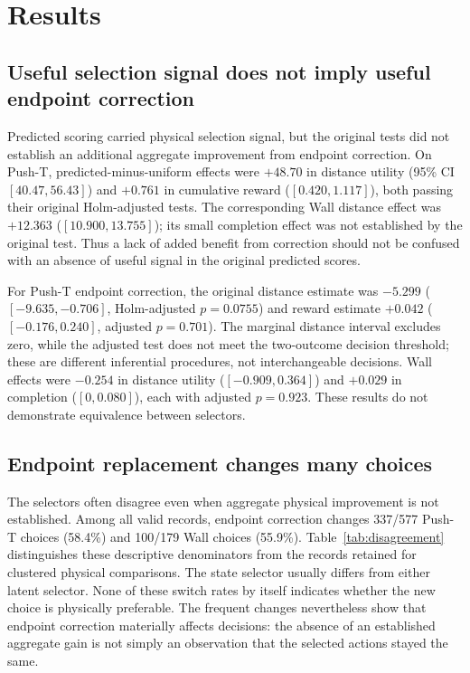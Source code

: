 \documentclass{article}
\begin{document}
\section{Results}

\subsection{Useful selection signal does not imply useful endpoint correction}

Predicted scoring carried physical selection signal, but the original tests
did not establish an additional aggregate improvement from endpoint correction.
On Push-T, predicted-minus-uniform effects were $+48.70$ in distance utility
(95\% CI $[40.47,56.43]$) and $+0.761$ in cumulative reward
($[0.420,1.117]$), both passing their original Holm-adjusted tests.
The corresponding Wall distance effect was $+12.363$ ($[10.900,13.755]$);
its small completion effect was not established by the original test.
Thus a lack of added benefit from correction should not be confused with
an absence of useful signal in the original predicted scores.

For Push-T endpoint correction, the original distance estimate was $-5.299$
($[-9.635,-0.706]$, Holm-adjusted $p=0.0755$) and reward estimate $+0.042$
($[-0.176,0.240]$, adjusted $p=0.701$). The marginal distance interval excludes
zero, while the adjusted test does not meet the two-outcome decision threshold;
these are different inferential procedures, not interchangeable decisions.
Wall effects were $-0.254$ in distance utility ($[-0.909,0.364]$) and $+0.029$
in completion ($[0,0.080]$), each with adjusted $p=0.923$.
These results do not demonstrate equivalence between selectors.

\subsection{Endpoint replacement changes many choices}

The selectors often disagree even when aggregate physical improvement is not
established. Among all valid records, endpoint correction changes 337/577
Push-T choices (58.4\%) and 100/179 Wall choices (55.9\%).
Table~\ref{tab:disagreement} distinguishes these descriptive denominators from
the records retained for clustered physical comparisons. The state selector
usually differs from either latent selector. None of these switch rates by
itself indicates whether the new choice is physically preferable.
The frequent changes nevertheless show that endpoint correction materially
affects decisions: the absence of an established aggregate gain is not simply
an observation that the selected actions stayed the same.
\end{document}
